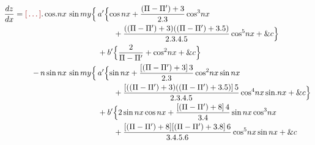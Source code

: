 \documentclass[11pt,a4paper]{article}
\begin{document}
\begin{align*}
\frac{dz}{dx} = \ill.\,\text{cos}.nx\ \text{sin}\,my\Bigl\{\,&a'\Bigl\{\text{cos}\,nx + \frac{(\Pi-\Pi')+3}{2.3}\,\text{cos}^3nx\\
&\qquad + \frac{((\Pi-\Pi')+3)((\Pi-\Pi')+3.5)}{2.3.4.5}\,\text{cos}^5nx + \&c\Bigr\}\\
&+b'\Bigl\{\frac{2}{\Pi-\Pi'} + \text{cos}^2nx + \&c\Bigr\}\\
-\,n\,\text{sin}\,nx\ \text{sin}\,my\Bigl\{\,&a'\Bigl\{\text{sin}\,nx + \frac{[(\Pi-\Pi')+3]\,3}{2.3}\,\text{cos}^2nx\,\text{sin}\,nx\\
&\qquad + \frac{[((\Pi-\Pi')+3)((\Pi-\Pi')+3.5)]\,5}{2.3.4.5}\,\text{cos}^4nx\,\text{sin}.nx + \&c\Bigr\}\\
&+b'\Bigl\{2\,\text{sin}\,nx\,\text{cos}\,nx + \frac{[(\Pi-\Pi')+8]\,4}{3.4}\,\text{sin}\,nx\,\text{cos}^3nx\\
&\qquad + \frac{[(\Pi-\Pi')+8][(\Pi-\Pi')+3.8]\,6}{3.4.5.6}\,\text{cos}^5nx\,\text{sin}\,nx + \&c
\end{align*}
\end{document}
